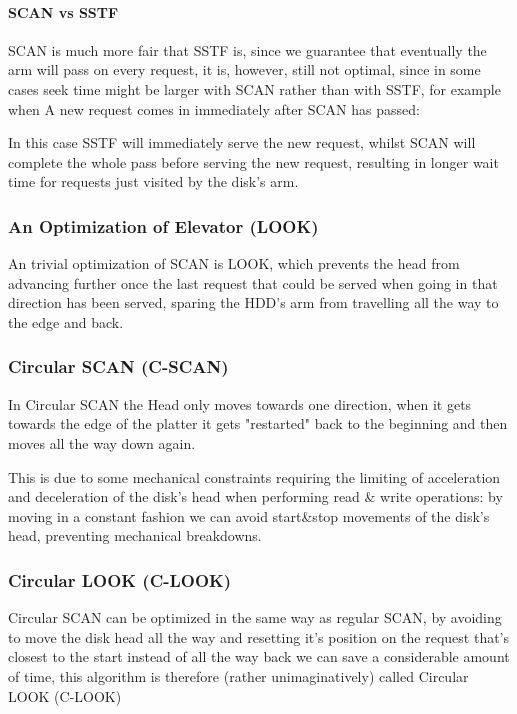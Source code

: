\documentclass[openright, twoside]{report}
\theoremstyle{definition}
\theoremstyle{example}
\begin{document}
\paragraph{SCAN vs SSTF}

SCAN is much more fair that SSTF is, since we guarantee that eventually the arm will pass 
on every request, it is, however, still not optimal, since in some cases seek time 
might be larger with SCAN rather than with SSTF, for example when A new request comes in immediately after SCAN has passed:


In this case SSTF will immediately serve the new request, whilst SCAN will complete the whole pass before 
serving the new request, resulting in longer wait time for requests just visited by the disk's arm.

\subsubsection{An Optimization of Elevator (LOOK)}

An trivial optimization of SCAN is LOOK, which prevents the head from advancing further once 
the last request that could be served when going in that direction has been served, sparing the 
HDD's arm from travelling all the way to the edge and back.

\subsubsection{Circular SCAN (C-SCAN)}
In Circular SCAN the Head only moves towards one direction, when it gets towards the edge of 
the platter it gets "restarted" back to the beginning and then moves all the way down again. 

This is due to some mechanical constraints requiring the limiting of acceleration and deceleration 
of the disk's head when performing read \& write operations: by moving in a constant fashion we can 
avoid start\&stop movements of the disk's head, preventing mechanical breakdowns.

\subsubsection{Circular LOOK (C-LOOK)}
Circular SCAN can be optimized in the same way as regular SCAN, by avoiding to move the 
disk head all the way and resetting it's position on the request that's closest to the start 
instead of all the way back we can save a considerable amount of time, this algorithm is 
therefore (rather unimaginatively) called Circular LOOK (C-LOOK)
\end{document}
